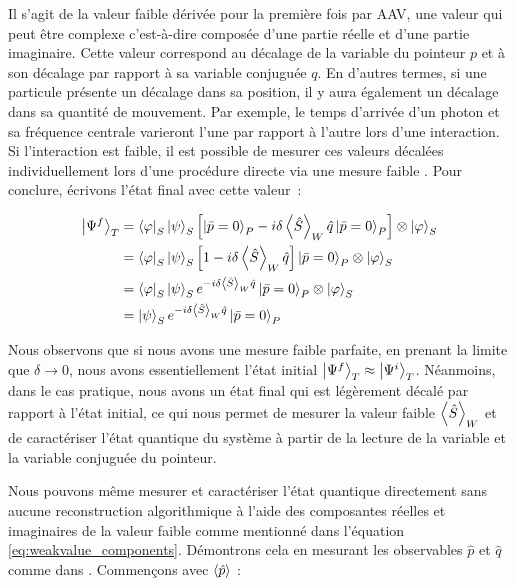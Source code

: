 \begin{onehalfspace}
    \noindent Il s’agit de la valeur faible dérivée pour la première 
    fois par AAV, une valeur qui peut être complexe 
    c'est-à-dire composée d’une partie réelle et 
    d’une partie imaginaire. Cette valeur correspond au décalage de la 
    variable du pointeur $p$ et à son décalage par rapport à sa variable 
    conjuguée $q$. En d’autres termes, si une particule présente un 
    décalage dans sa position, il y aura également un décalage dans sa 
    quantité de mouvement. Par exemple, le temps d'arrivée d’un photon et 
    sa fréquence centrale varieront l’une par rapport à l’autre lors 
    d’une interaction. Si l’interaction est faible, il est possible de 
    mesurer ces valeurs décalées individuellement lors d’une procédure 
    directe via une mesure faible \cite{Hairiri,Lundeen_Resch,Lundeen_Direct_Measurement,Guilleaum}. 
    Pour conclure, écrivons l’état final avec cette valeur :

    \begin{align}
        \ket{\Psi^f}_T &= \bra{\varphi}_S\ket{\psi}_S \Bigl[ \ket{\bar{p} = 0}_P - i\delta \expval{\hat{S}}_W \hat{q}\ket{\bar{p}=0}_P \Bigr] \otimes \ket{\varphi}_S\\
        &= \bra{\varphi}_S\ket{\psi}_S\Bigl[ 1 - i\delta \expval{\hat{S}}_W \hat{q} \Bigr] \ket{\bar{p} = 0}_P \otimes \ket{\varphi}_S\\
        &= \bra{\varphi}_S\ket{\psi}_S e^{-i\delta \expval{\hat{S}}_W \hat{q}} \ket{\bar{p} = 0}_P \otimes \ket{\varphi}_S\\
        &= \ket{\psi}_S e^{-i\delta \expval{\hat{S}}_W \hat{q}}\ket{\bar{p}=0}_P
    \end{align}

    \noindent Nous observons que si nous avons une mesure faible parfaite, 
    en prenant la limite que $\delta \to 0 $, nous avons essentiellement 
    l’état initial $\ket{\Psi^f}_T \approx \ket{\Psi^i}_T$. 
    Néanmoins, dans le cas pratique, nous avons un état final qui est légèrement décalé par rapport à 
    l’état initial, ce qui nous permet de mesurer la valeur faible 
    $\expval{\hat{S}}_W$ et de caractériser l’état quantique du système à partir de la 
    lecture de la variable et la variable conjuguée du pointeur.

    \noindent Nous pouvons même mesurer et caractériser l'état 
    quantique directement sans aucune reconstruction algorithmique à 
    l'aide des composantes réelles et imaginaires de la valeur faible
    comme mentionné dans l'équation \ref{eq:weakvalue_components}. 
    Démontrons cela en mesurant les observables $\hat{p}$ et $\hat{q}$ 
    comme dans \cite{Lundeen_thesis,Lundeen_Resch}. Commençons
    avec $\expval{\hat{p}}$ :


\end{onehalfspace}
